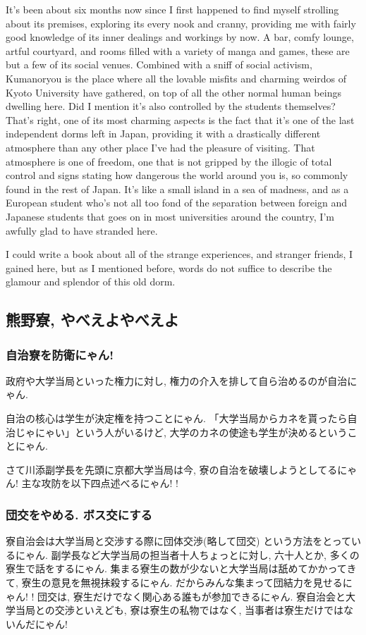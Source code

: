 \documentclass[10pt,b5jsbook,dvips,dvipdfmx,openany]{jsbook}
\theoremstyle{definition}
\begin{document}
		It's been about six months now since I first happened to find myself strolling about its premises, exploring its every nook and cranny, providing me with fairly good knowledge of its inner dealings and workings by now. A bar, comfy lounge, artful courtyard, and rooms filled with a variety of manga and games, these are but a few of its social venues. Combined with a sniff of social activism, Kumanoryou is the place where all the lovable misfits and charming weirdos of Kyoto University have gathered, on top of all the other normal human beings dwelling here. Did I mention it's also controlled by the students themselves? That's right, one of its most charming aspects is the fact that it's one of the last independent dorms left in Japan, providing it with a drastically different atmosphere than any other place I've had the pleasure of visiting. That atmosphere is one of freedom, one that is not gripped by the illogic of total control and signs stating how dangerous the world around you is, so commonly found in the rest of Japan. It's like a small island in a sea of madness, and as a European student who's not all too fond of the separation between foreign and Japanese students that goes on in most universities around the country, I'm awfully glad to have stranded here. 

		I could write a book about all of the strange experiences, and stranger friends, I gained here, but as I mentioned before, words do not suffice to describe the glamour and splendor of this old dorm.



		\subsection{熊野寮, やべえよやべえよ} 

			\subsubsection{自治寮を防衛にゃん! }
			政府や大学当局といった権力に対し, 権力の介入を排して自ら治めるのが自治にゃん. 
		
			自治の核心は学生が決定権を持つことにゃん. 「大学当局からカネを貰ったら自治じゃにゃい」という人がいるけど, 大学のカネの使途も学生が決めるということにゃん. 
	
			さて川添副学長を先頭に京都大学当局は今, 寮の自治を破壊しようとしてるにゃん! 主な攻防を以下四点述べるにゃん! ! 

			\subsubsection{団交をやめる. ボス交にする}
			寮自治会は大学当局と交渉する際に団体交渉(略して団交) という方法をとっているにゃん. 副学長など大学当局の担当者十人ちょっとに対し, 六十人とか, 多くの寮生で話をするにゃん. 集まる寮生の数が少ないと大学当局は舐めてかかってきて, 寮生の意見を無視抹殺するにゃん. だからみんな集まって団結力を見せるにゃん! ! 団交は, 寮生だけでなく関心ある誰もが参加できるにゃん. 寮自治会と大学当局との交渉といえども, 寮は寮生の私物ではなく, 当事者は寮生だけではないんだにゃん! 
\end{document}
